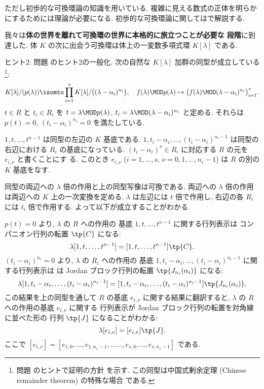 \documentclass[12pt,twoside]{jarticle}
\begin{document}
ただし初歩的な可換環論の知識を用いている.
複雑に見える数式の正体を明らかにするためには理論が必要になる.
初歩的な可換環論に関してはで解説する.

\bigskip

{\Large 我々は{\bf 体の世界を離れて可換環の世界に本格的に旅立つことが必要な
    段階}に到達した.  
  体 $K$ の次に出会う可換環は体上の一変数多項式環 $K[\lambda]$ である.}

\bigskip
\noindent
ヒント2: 問題  のヒント2の一般化.
次の自然な $K[\lambda]$ 加群の同型が成立している%
\footnote{問題  のヒントで証明の方針
  を示す. この同型は中国式剰余定理 (Chinese remainder theorem) の特殊な場合
  である.}:
\begin{equation*}
  K[\lambda]/(p(\lambda)) 
  \isomto 
  \prod_{i=1}^s K[\lambda]/\bigl((\lambda-\alpha_i)^{n_i}\bigr),
  \quad
  f(\lambda)\MOD p(\lambda)
  \mapsto
  \bigl(f(\lambda)\MOD (\lambda-\alpha_i)^{n_i}\bigr)_{i=1}^s.
\end{equation*}
$t\in R$ と $t_i\in R_i$ を $t=\lambda\MOD p(\lambda)$, 
$t_i=\lambda\MOD(\lambda-\alpha_i)^{n_i}$ と定める.
それらは $p(t)=0$, $(t_i-\alpha_i)^{n_i}=0$ を満たしている.

$1,t,\dots,t^{n-1}$ は同型の左辺の $K$ 基底である.
$1,t_i-\alpha_i,\dots,(t_i-\alpha_i)^{n_i-1}$ 
は同型の右辺における $R_i$ の基底になっている.  
$(t_i-\alpha_i)^\nu\in R_i$ に対応する $R$ の元を $e_{i,\nu}$ と書くことにす
る. このとき $e_{i,\nu}$ ($i=1,\dots,s$, $\nu=0,1,\dots,n_i-1$) 
は $R$ の別の $K$ 基底をなす.

同型の両辺への $\lambda$ 倍の作用と上の同型写像は可換である.
両辺への $\lambda$ 倍の作用は両辺への $K$ 上の一次変換を定める.
$\lambda$ は左辺には $t$ 倍で作用し, 
右辺の各 $R_i$ には $t_i$ 倍で作用する.
よって以下が成立することがわかる.

$p(t)=0$ より, $\lambda$ の $R$ への作用の
基底 $1,t,\dots,t^{n-1}$ に関する行列表示は
コンパニオン行列の転置 $\tp{C}$ になる:
\begin{equation*}
  \lambda [1,t,\dots,t^{n-1}] = [1,t,\dots,t^{n-1}]\tp{C}.
\end{equation*}
$(t_i-\alpha_i)^{n_i}=0$ より, $\lambda$ の $R_i$ への作用の
基底 $1,t_i-\alpha_i,\dots,(t_i-\alpha_i)^{n_i-1}$ に関する行列表示は
は Jordan ブロック行列の転置 $\tp{J_{n_i}(\alpha_i)}$ になる:
\begin{equation*}
  \lambda [1, t_i-\alpha_i, \dots, (t_i-\alpha_i)^{n_i-1}]
  = [1, t_i-\alpha_i, \dots, (t_i-\alpha_i)^{n_i-1}] \tp{J_{n_i}(\alpha_i)}.
\end{equation*}
この結果を上の同型を通して $R$ の基底 $e_{i,\nu}$ に関する結果に翻訳すると, 
$\lambda$ の $R$ への作用の基底 $e_{i,\nu}$ に関する
行列表示が Jordan ブロック行列の転置を対角線に並べた形の
行列 $\tp{J}$ になることがわかる:
\begin{equation*}
  \lambda [e_{i,\nu}] = [e_{i,\nu}] \tp{J}.
\end{equation*}
ここで $[e_{i,\nu}]=
[e_{1,0},\dots,e_{1,n_1-1},\ldots\ldots,e_{s,0},\dots,e_{s,n_s-1}]$ である.
\end{document}
